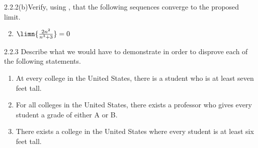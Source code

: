 \begin{exercise}
    {2.2.2(b)}Verify, using , that
    the following sequences converge to the proposed limit.
    \begin{enumerate}
        \setcounter{enumi}{1}
        \item \(\limn{\frac{2n^2}{n^3+3}} = 0\)
    \end{enumerate}
\end{exercise}


\begin{exercise}
    {2.2.3} Describe what we would have to demonstrate in order to disprove each of the following statements.
    \begin{enumerate}
        \item At every college in the United States, there is a student who is at least
              seven feet tall.
        \item For all colleges in the United States, there exists a professor who gives every student a grade of either A or B.
        \item There exists a college in the United States where every student is at least six feet tall.
    \end{enumerate}
\end{exercise}

